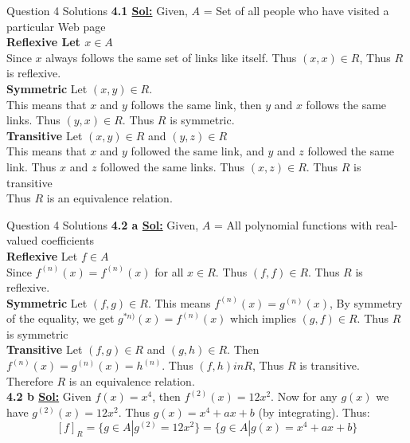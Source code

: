 \documentclass[xcolor=svgnames]{beamer}
\begin{document}
\begin{frame}{Question 4 Solutions}
    \textbf{4.1 \underline{Sol:}} Given, $A$ = Set of all people who have visited a particular Web page\\
    \textbf{Reflexive Let $x \in A$}\\
    Since $x$ always follows the same set of links like itself. Thus $(x,x) \in R$, Thus $R$ is reflexive.\\
    \textbf{Symmetric} Let $(x, y) \in R$.\\
    This means that $x$ and $y$ follows the same link, then $y$ and $x$ follows the same links. Thus $(y, x) \in R$. Thus $R$ is symmetric.\\
    \textbf{Transitive} Let $(x, y) \in R$ and $(y, z) \in R$ \\
    This means that $x$ and $y$ followed the same link, and $y$ and $z$ followed the same link. Thus $x$ and $z$ followed the same links. Thus $(x, z) \in R$. Thus $R$ is transitive \\
    Thus $R$ is an equivalence relation.
\end{frame}

\begin{frame}{Question 4 Solutions}
    \textbf{4.2 a \underline{Sol:}} Given, $A$ = All polynomial functions with real-valued coefficients \\
    \textbf{Reflexive} Let $f \in A$\\
    Since $f^{(n)}(x) = f^{(n)}(x)$ for all $x \in R$. Thus $(f, f) \in R$. Thus $R$ is reflexive.\\
    \textbf{Symmetric} Let $(f, g) \in R$. This means $f^{(n)}(x) = g^{(n)}(x)$, By symmetry of the equality, we get $g^{*n)}(x) = f^{(n)}(x)$ which implies $(g, f) \in R$. Thus $R$ is symmetric \\
    \textbf{Transitive} Let $(f,g) \in R$ and $(g, h) \in R$. Then $f^{(n)}(x) = g^{(n)}(x) = h^{(n)}$. Thus $(f, h) in R$, Thus $R$ is transitive. \\
    Therefore $R$ is an equivalence relation. \\
    \vspace{4mm}
    \textbf{4.2 b \underline{Sol:}} Given $f(x) = x^4$, then $f^{(2)}(x) = 12x^2$. Now for any $g(x)$ we have $g^{(2)}(x) = 12x^2$. Thus $g(x) = x^4 + ax + b$ (by integrating). Thus: 
    \[
        [f]_R = \{g \in A | g^{(2)} = 12x^2\} = \{g \in A | g(x) = x^4 + ax + b\}
    \]

\end{frame}
\end{document}
